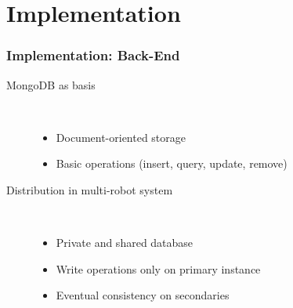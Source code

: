 \section{Implementation}
\begin{frame}
  \frametitle{Implementation: Back-End}
  \begin{description}
  \item[MongoDB as basis]%
                \hfill \\
    \begin{itemize}
    \item Document-oriented storage
    \item Basic operations (insert, query, update, remove)
    \end{itemize}
  \item[Distribution in multi-robot system]%
                \hfill \\
    \begin{itemize}
    \item Private and shared database
    \item Write operations only on primary instance
    \item Eventual consistency on secondaries %
    \end{itemize}
  \end{description}
\end{frame}

